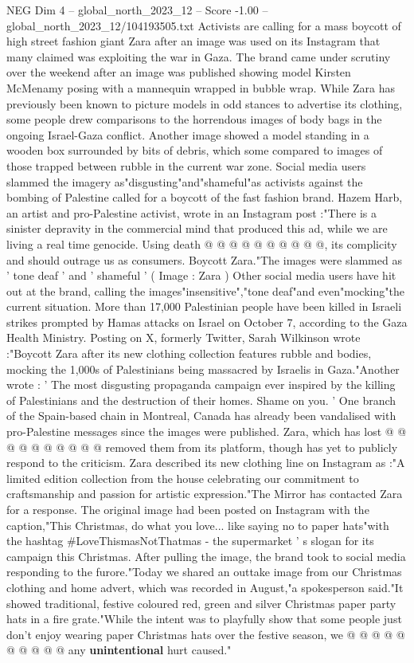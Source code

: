 \begin{textsample}{NEG Dim 4 – global\_north\_2023\_12 – Score -1.00 – global\_north\_2023\_12/104193505.txt}  \label{ex:f4_neg_151}
Activists are calling for a mass boycott of high street fashion giant Zara after an image was used on its Instagram that many claimed was exploiting the war in Gaza.
The brand came under scrutiny over the weekend after an image was published showing model Kirsten McMenamy posing with a mannequin wrapped in bubble wrap.
While Zara has previously been known to picture models in odd stances to advertise its clothing, some people drew comparisons to the horrendous images of body bags in the ongoing Israel-Gaza conflict.
Another image showed a model standing in a wooden box surrounded by bits of debris, which some compared to images of those trapped between rubble in the current war zone.
Social media users slammed the imagery as"disgusting"and"shameful"as activists against the bombing of Palestine called for a boycott of the fast fashion brand.
Hazem Harb, an artist and pro-Palestine activist, wrote in an Instagram post :"There is a sinister depravity in the commercial mind that produced this ad, while we are living a real time genocide.
Using death @ @ @ @ @ @ @ @ @ @, its complicity and should outrage us as consumers.
Boycott Zara."The images were slammed as ' tone deaf ' and ' shameful ' ( Image : Zara ) Other social media users have hit out at the brand, calling the images"insensitive","tone deaf"and even"mocking"the current situation.
More than 17,000 Palestinian people have been killed in Israeli strikes prompted by Hamas attacks on Israel on October 7, according to the Gaza Health Ministry.
Posting on X, formerly Twitter, Sarah Wilkinson wrote :"Boycott Zara after its new clothing collection features rubble and bodies, mocking the 1,000s of Palestinians being massacred by Israelis in Gaza."Another wrote : ' The most disgusting propaganda campaign ever inspired by the killing of Palestinians and the destruction of their homes.
Shame on you. ' One branch of the Spain-based chain in Montreal, Canada has already been vandalised with pro-Palestine messages since the images were published.
Zara, which has lost @ @ @ @ @ @ @ @ @ @ removed them from its platform, though has yet to publicly respond to the criticism.
Zara described its new clothing line on Instagram as :"A limited edition collection from the house celebrating our commitment to craftsmanship and passion for artistic expression."The Mirror has contacted Zara for a response.
The original image had been posted on Instagram with the caption,"This Christmas, do what you love... like saying no to paper hats"with the hashtag \#LoveThismasNotThatmas - the supermarket ' s slogan for its campaign this Christmas.
After pulling the image, the brand took to social media responding to the furore."Today we shared an outtake image from our Christmas clothing and home advert, which was recorded in August,"a spokesperson said."It showed traditional, festive coloured red, green and silver Christmas paper party hats in a fire grate."While the intent was to playfully show that some people just don't enjoy wearing paper Christmas hats over the festive season, we @ @ @ @ @ @ @ @ @ @ any \textbf{unintentional} hurt caused."

\end{textsample}
